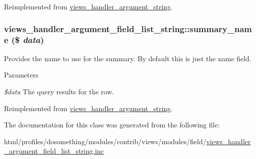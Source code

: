 Reimplemented from \hyperlink{classviews__handler__argument__string_ab96e2120f4f4458921f817b343d11ef0}{views\_\-handler\_\-argument\_\-string}.\hypertarget{classviews__handler__argument__field__list__string_a02abc27f8dfd06bd5c6f9e24860afe9c}{
\subsubsection[{summary\_\-name}]{\setlength{\rightskip}{0pt plus 5cm}views\_\-handler\_\-argument\_\-field\_\-list\_\-string::summary\_\-name (\$ {\em data})}}
\label{classviews__handler__argument__field__list__string_a02abc27f8dfd06bd5c6f9e24860afe9c}
Provides the name to use for the summary. By default this is just the name field.


\begin{DoxyParams}{Parameters}
\item[{\em \$data}]The query results for the row. \end{DoxyParams}


Reimplemented from \hyperlink{classviews__handler__argument__string_a8cc60c274ca743c78de23260edc3ee4a}{views\_\-handler\_\-argument\_\-string}.

The documentation for this class was generated from the following file:\begin{DoxyCompactItemize}
\item 
html/profiles/dosomething/modules/contrib/views/modules/field/\hyperlink{views__handler__argument__field__list__string_8inc}{views\_\-handler\_\-argument\_\-field\_\-list\_\-string.inc}\end{DoxyCompactItemize}
